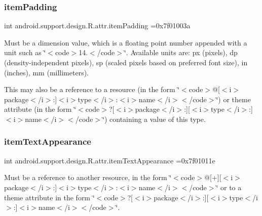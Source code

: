 \subsubsection{\texorpdfstring{item\+Padding}{itemPadding}}
{\footnotesize\ttfamily int android.\+support.\+design.\+R.\+attr.\+item\+Padding =0x7f01003a\hspace{0.3cm}{\ttfamily [static]}}

Must be a dimension value, which is a floating point number appended with a unit such as \char`\"{}$<$code$>$14.\+5sp$<$/code$>$\char`\"{}. Available units are\+: px (pixels), dp (density-\/independent pixels), sp (scaled pixels based on preferred font size), in (inches), mm (millimeters). 

This may also be a reference to a resource (in the form \char`\"{}$<$code$>$@\mbox{[}$<$i$>$package$<$/i$>$\+:\mbox{]}$<$i$>$type$<$/i$>$\+:$<$i$>$name$<$/i$>$$<$/code$>$\char`\"{}) or theme attribute (in the form \char`\"{}$<$code$>$?\mbox{[}$<$i$>$package$<$/i$>$\+:\mbox{]}\mbox{[}$<$i$>$type$<$/i$>$\+:\mbox{]}$<$i$>$name$<$/i$>$$<$/code$>$\char`\"{}) containing a value of this type. \mbox{\label{classandroid_1_1support_1_1design_1_1R_1_1attr_a6cb807da22881ce46c383a4b700f7f0e}} 
\subsubsection{\texorpdfstring{item\+Text\+Appearance}{itemTextAppearance}}
{\footnotesize\ttfamily int android.\+support.\+design.\+R.\+attr.\+item\+Text\+Appearance =0x7f01011e\hspace{0.3cm}{\ttfamily [static]}}

Must be a reference to another resource, in the form \char`\"{}$<$code$>$@\mbox{[}+\mbox{]}\mbox{[}$<$i$>$package$<$/i$>$\+:\mbox{]}$<$i$>$type$<$/i$>$\+:$<$i$>$name$<$/i$>$$<$/code$>$\char`\"{} or to a theme attribute in the form \char`\"{}$<$code$>$?\mbox{[}$<$i$>$package$<$/i$>$\+:\mbox{]}\mbox{[}$<$i$>$type$<$/i$>$\+:\mbox{]}$<$i$>$name$<$/i$>$$<$/code$>$\char`\"{}. \mbox{\label{classandroid_1_1support_1_1design_1_1R_1_1attr_ae84392b543d3266d75d0a138ae68d544}} 
